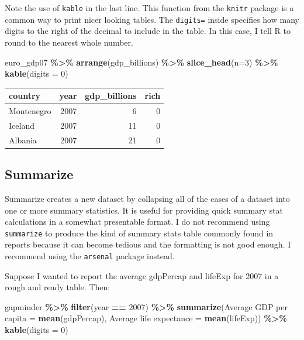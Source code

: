 \documentclass[
]{book}
\makeatletter
\newenvironment{Shaded}{\begin{snugshade}}{\end{snugshade}}
\newcommand{\AttributeTok}[1]{\textcolor[rgb]{0.27,0.27,0.27}{#1}}
\newcommand{\DecValTok}[1]{\textcolor[rgb]{0.06,0.06,0.06}{#1}}
\newcommand{\FunctionTok}[1]{\textcolor[rgb]{0.27,0.27,0.27}{\textbf{#1}}}
\newcommand{\NormalTok}[1]{#1}
\newcommand{\OtherTok}[1]{\textcolor[rgb]{0.37,0.37,0.37}{#1}}
\newcommand{\SpecialCharTok}[1]{\textcolor[rgb]{0.43,0.43,0.43}{\textbf{#1}}}
\newcommand{\StringTok}[1]{\textcolor[rgb]{0.5,0.5,0.5}{#1}}
\newenvironment{kframe}{%
\medskip{}
\setlength{\fboxsep}{.8em}
 \def\at@end@of@kframe{}%
 \ifinner\ifhmode%
  \def\at@end@of@kframe{\end{minipage}}%
  \begin{minipage}{\columnwidth}%
 \fi\fi%
 \def\FrameCommand##1{\hskip\@totalleftmargin \hskip-\fboxsep
 \colorbox{shadecolor}{##1}\hskip-\fboxsep
     \hskip-\linewidth \hskip-\@totalleftmargin \hskip\columnwidth}%
 \MakeFramed {\advance\hsize-\width
   \@totalleftmargin\z@ \linewidth\hsize
   \@setminipage}}%
 {\par\unskip\endMakeFramed%
 \at@end@of@kframe}
\renewenvironment{Shaded}{\begin{kframe}}{\end{kframe}}
\makeatother
\begin{document}
Note the use of \texttt{kable} in the last line. This function from the \texttt{knitr} package is a common way to print nicer looking tables. The \texttt{digits=} inside specifies how many digits to the right of the decimal to include in the table. In this case, I tell R to round to the nearest whole number.

\begin{Shaded}
\begin{Highlighting}[]
\NormalTok{euro\_gdp07 }\SpecialCharTok{\%\textgreater{}\%} 
  \FunctionTok{arrange}\NormalTok{(gdp\_billions) }\SpecialCharTok{\%\textgreater{}\%} 
  \FunctionTok{slice\_head}\NormalTok{(}\AttributeTok{n=}\DecValTok{3}\NormalTok{) }\SpecialCharTok{\%\textgreater{}\%} 
  \FunctionTok{kable}\NormalTok{(}\AttributeTok{digits =} \DecValTok{0}\NormalTok{)}
\end{Highlighting}
\end{Shaded}

\begin{tabular}{l|r|r|r}
\hline
country & year & gdp\_billions & rich\\
\hline
Montenegro & 2007 & 6 & 0\\
\hline
Iceland & 2007 & 11 & 0\\
\hline
Albania & 2007 & 21 & 0\\
\hline
\end{tabular}

\hypertarget{summarize}{%
\subsection{Summarize}\label{summarize}}

Summarize creates a new dataset by collapsing all of the cases of a dataset into one or more summary statistics. It is useful for providing quick summary stat calculations in a somewhat presentable format. I do not recommend using \texttt{summarize} to produce the kind of summary stats table commonly found in reports because it can become tedious and the formatting is not good enough. I recommend using the \texttt{arsenal} package instead.

Suppose I wanted to report the average gdpPercap and lifeExp for 2007 in a rough and ready table. Then:

\begin{Shaded}
\begin{Highlighting}[]
\NormalTok{gapminder }\SpecialCharTok{\%\textgreater{}\%} 
  \FunctionTok{filter}\NormalTok{(year }\SpecialCharTok{==} \DecValTok{2007}\NormalTok{) }\SpecialCharTok{\%\textgreater{}\%} 
  \FunctionTok{summarize}\NormalTok{(}\StringTok{\textquotesingle{}Average GDP per capita\textquotesingle{}} \OtherTok{=} \FunctionTok{mean}\NormalTok{(gdpPercap), }
            \StringTok{\textquotesingle{}Average life expectance\textquotesingle{}} \OtherTok{=} \FunctionTok{mean}\NormalTok{(lifeExp)) }\SpecialCharTok{\%\textgreater{}\%} 
  \FunctionTok{kable}\NormalTok{(}\AttributeTok{digits =} \DecValTok{0}\NormalTok{)}
\end{Highlighting}
\end{Shaded}
\end{document}
